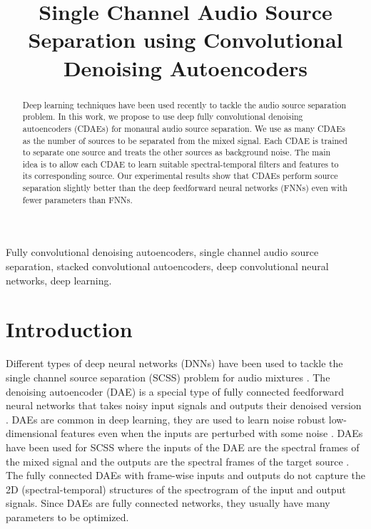 \documentclass{article}
\title{Single Channel Audio Source Separation using Convolutional Denoising Autoencoders}
\begin{document}
\ninept
%
\maketitle
%
\begin{abstract}
Deep learning techniques have been used recently to tackle the audio source separation problem. In this work, we propose to use deep fully convolutional denoising autoencoders (CDAEs) for monaural audio source separation. We use as many CDAEs as the number of sources to be separated from the mixed signal. Each CDAE is trained to separate one source and treats the other sources as background noise. The main idea is to allow each CDAE to learn suitable spectral-temporal filters and features to its corresponding source. Our experimental results show that CDAEs perform source separation slightly better than the deep feedforward neural networks (FNNs) even with fewer parameters than FNNs.
\end{abstract}
%
\begin{keywords}
Fully convolutional denoising autoencoders, single channel audio source separation, stacked convolutional autoencoders, deep convolutional neural networks, deep learning.
\end{keywords}
%
\section{Introduction}
\label{sec:intro}
Different types of deep neural networks (DNNs) have been used to tackle the single channel source separation (SCSS) problem for audio mixtures \cite{Stefan:17:imssbdnntdanb,Grais:17:descassdnn, Kim:15:adaatsltm, chandna:17:massudcnn}. The denoising autoencoder (DAE) is a special type of fully connected feedforward neural networks that takes noisy input signals and outputs their denoised version \cite{Xie:12:ididnn,Vincent:10:sdalurdnldc}. DAEs are common in deep learning, they are used to learn noise robust low-dimensional features even when the inputs are perturbed with some noise \cite{Pascal:08:ecrfda,HinSal:06:rddnn}. DAEs have been used for SCSS where the inputs of the DAE are the spectral frames of the mixed signal and the outputs are the spectral frames of the target source \cite{Kim:15:adaatsltm, Paris:17:nnanmf}. The fully connected DAEs with frame-wise inputs and outputs do not capture the 2D (spectral-temporal) structures of the spectrogram of the input and output signals. Since DAEs are fully connected networks, they usually have many parameters to be optimized.
\end{document}
